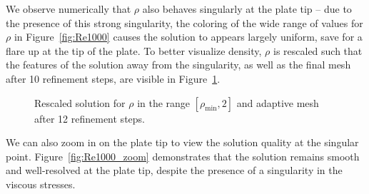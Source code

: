We observe numerically that $\rho$ also behaves singularly at the plate tip -- due to the presence of this strong singularity, the coloring of the wide range of values for $\rho$ in Figure~\ref{fig:Re1000} causes the solution to appears largely uniform, save for a flare up at the tip of the plate.  To better visualize density, $\rho$ is rescaled such that the features of the solution away from the singularity, as well as the final mesh after 10 refinement steps, are visible in Figure~\ref{fig:rhoScaled}.    

\begin{figure}
\centering
{}
\caption{Rescaled solution for $\rho$ in the range $[\rho_{\min},2]$ and adaptive mesh after 12 refinement steps.}
\label{fig:rhoScaled}
\end{figure}

We can also zoom in on the plate tip to view the solution quality at the singular point.  Figure~\ref{fig:Re1000_zoom} demonstrates that the solution remains smooth and well-resolved at the plate tip, despite the presence of a singularity in the viscous stresses.%

